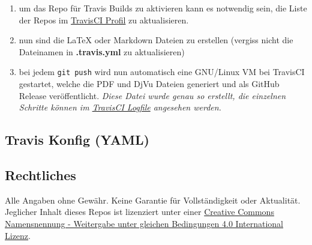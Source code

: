 \documentclass[]{article}
\providecommand{\tightlist}{
  \setlength{\itemsep}{0pt}\setlength{\parskip}{0pt}}
\begin{document}
\begin{enumerate}
\def\labelenumi{\arabic{enumi}.}
\tightlist
\item
  um das Repo für Travis Builds zu aktivieren kann es notwendig sein,
  die Liste der Repos im \href{https://travis-ci.org/profile}{TravisCI
  Profil} zu aktualisieren.
\item
  nun sind die LaTeX oder Markdown Dateien zu erstellen (vergiss nicht
  die Dateinamen in \textbf{.travis.yml} zu aktualisieren)
\item
  bei jedem \texttt{git\ push} wird nun automatisch eine GNU/Linux VM
  bei TravisCI gestartet, welche die PDF und DjVu Dateien generiert und
  als GitHub Release veröffentlicht. \emph{Diese Datei wurde genau so
  erstellt, die einzelnen Schritte können im
  \href{https://travis-ci.org/SimonWaldherr/testrepo}{TravisCI Logfile}
  angesehen werden.}
\end{enumerate}

\subsection{Travis Konfig (YAML)}\label{travis-konfig-yaml}



\subsection{Rechtliches}\label{rechtliches}

Alle Angaben ohne Gewähr. Keine Garantie für Vollständigkeit oder
Aktualität. Jeglicher Inhalt dieses Repos ist lizenziert unter einer
\href{http://creativecommons.org/licenses/by-sa/4.0/}{Creative Commons
Namensnennung - Weitergabe unter gleichen Bedingungen 4.0 International
Lizenz}.
\end{document}
